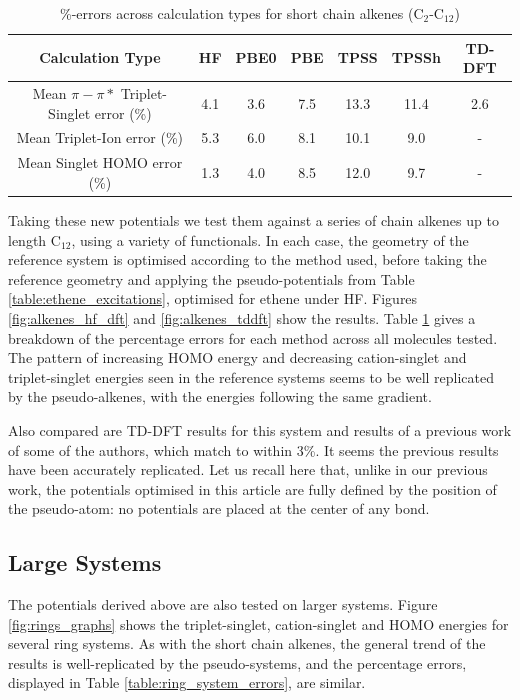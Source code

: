 \documentclass[journal=jctcce,manuscript=article]{achemso}
\begin{document}
\begin{table}[h]
\caption{\%-errors across calculation types for short chain alkenes  (C\(_{2}\)-C\(_{12}\))}
\begin{tabular}{c c c c c c c}
\hline
Calculation Type & HF & PBE0 & PBE & TPSS & TPSSh & TD-DFT \\
\hline\hline
Mean \(\pi - \pi*\) Triplet-Singlet error (\%) & 4.1 & 3.6 & 7.5 & 13.3 & 11.4 & 2.6 \\
Mean Triplet-Ion error (\%) & 5.3 & 6.0 & 8.1 & 10.1 & 9.0 & - \\
Mean Singlet HOMO error (\%) & 1.3 & 4.0 & 8.5 & 12.0 & 9.7 & - \\
\hline
\end{tabular}
\label{table:alkene_errors}
\end{table}

Taking these new potentials we test them against a series of chain alkenes up to length C\(_{12}\), using a variety of functionals. In each case, the geometry of the reference system is optimised according to the method used, before taking the reference geometry and applying the pseudo-potentials from Table \ref{table:ethene_excitations}, optimised for ethene under HF. Figures \ref{fig:alkenes_hf_dft} and \ref{fig:alkenes_tddft} show the results. Table \ref{table:alkene_errors} gives a breakdown of the percentage errors for each method across all molecules tested. The pattern of increasing HOMO energy and decreasing cation-singlet and triplet-singlet energies seen in the reference systems seems to be well replicated by the pseudo-alkenes, with the energies following the same gradient.

Also compared are TD-DFT results for this system and results of a previous work of some of the authors, which match to within 3\%.
It seems the previous results have been accurately replicated.\cite{drujon_pseudopotentials_2013}
Let us recall here that, unlike in our previous work,
the potentials optimised in this article are fully defined by the position
of the pseudo-atom: no potentials are placed at the center of any bond.

\subsection{Large Systems}

The potentials derived above are also tested on larger systems. Figure \ref{fig:rings_graphs} shows the triplet-singlet, cation-singlet and HOMO energies for several ring systems. As with the short chain alkenes, the general trend of the results is well-replicated by the pseudo-systems, and the percentage errors, displayed in Table \ref{table:ring_system_errors}, are similar.
\end{document}
